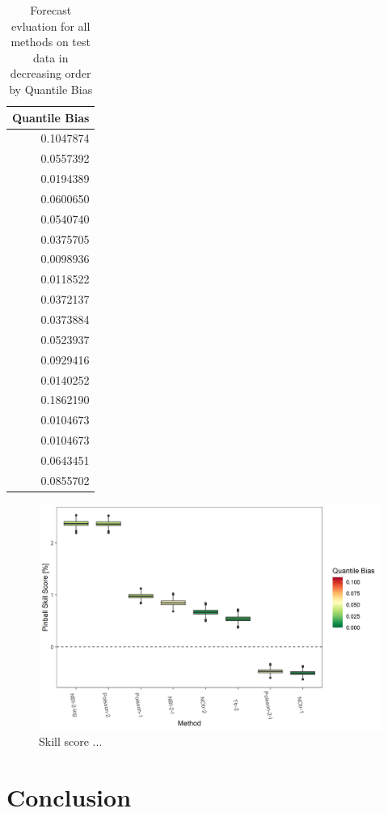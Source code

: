 \documentclass[]{elsarticle} %
\begin{document}
\begin{table}[!h]

\caption{\label{tab:tab-results-qbias}Forecast evluation for all methods on test data in decreasing order by Quantile Bias}
\centering
\fontsize{11}{13}\selectfont
\begin{tabular}[t]{r}
\toprule
Quantile Bias\\
\midrule
0.1047874\\
0.0557392\\
0.0194389\\
0.0600650\\
0.0540740\\
0.0375705\\
0.0098936\\
0.0118522\\
0.0372137\\
0.0373884\\
0.0523937\\
0.0929416\\
0.0140252\\
0.1862190\\
0.0104673\\
0.0104673\\
0.0643451\\
0.0855702\\
\bottomrule
\end{tabular}
\end{table}

\begin{figure}[H]

{\centering \includegraphics[width=0.9\linewidth]{../results/Skill_rel2bench_reduced} 

}

\caption{Skill score ...}\label{fig:fig-skill}
\end{figure}

\hypertarget{conclusion}{%
\section{Conclusion}\label{conclusion}}

\renewcommand\refname{References}

\end{document}
